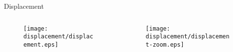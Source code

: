 \begin{frame}{Displacement}%
    \begin{columns}[T,onlytextwidth]%
        \begin{column}[T]{0.5\textwidth}%
            \begin{figure}[htb]%
                \centering%
                \texttt{[image: displacement/displacement.eps]}
            \end{figure}%
        \end{column}%
        \begin{column}[T]{0.5\textwidth}%
            \begin{figure}[htb]%
                \centering%
                \texttt{[image: displacement/displacement-zoom.eps]}  
            \end{figure}%
        \end{column}%
    \end{columns}%
\end{frame}%
%